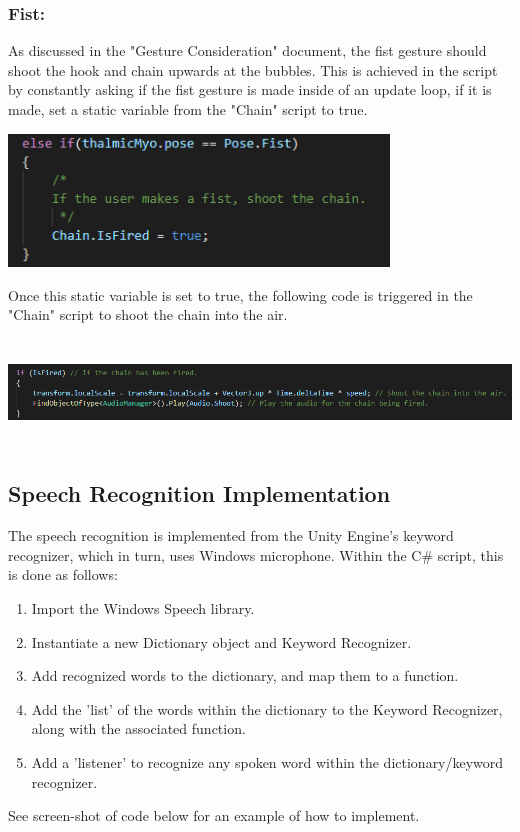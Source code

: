 \documentclass{article}
\begin{document}
\bigskip

\subsubsection{Fist:}

As discussed in the "Gesture Consideration" document, the fist gesture should shoot the hook and chain upwards at the bubbles. This is achieved in the script by constantly asking if the fist gesture is made inside of an update loop, if it is made, set a static variable from the "Chain" script to true. 

\bigskip

\includegraphics[width=\textwidth, height=100pt]{img/FistPose.PNG}

\bigskip

Once this static variable is set to true, the following code is triggered in the "Chain" script to shoot the chain into the air.

\bigskip

\includegraphics[width=\textwidth, height=80pt]{img/IsFired.PNG}

\bigskip



\subsection{Speech Recognition Implementation}
The speech recognition is implemented from the Unity Engine's keyword recognizer, which in turn, uses Windows microphone. Within the C\# script, this is done as follows:

\begin{enumerate}
    \item Import the Windows Speech library.
    \item Instantiate a new Dictionary object and Keyword Recognizer.
    \item Add recognized words to the dictionary, and map them to a function.
    \item Add the 'list' of the words within the dictionary to the Keyword Recognizer, along with the associated function.
    \item Add a 'listener' to recognize any spoken word within the dictionary/keyword recognizer.
\end{enumerate}
See screen-shot of code below for an example of how to implement.
\end{document}
